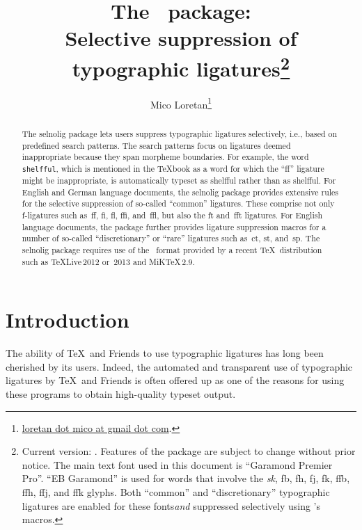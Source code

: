 \documentclass[11pt]{article}
\title{The \selnoligpackagename\ package: \\
Selective suppression of typographic ligatures\thanks{
Current version: \selnoligpackageversion. Features of the \pkg{selnolig} package are subject to change without prior notice. 
\newline\hspace*{\parindent}
The main text font used in this document is \enquote{Garamond Premier Pro}. \enquote{\ebg EB Garamond} is used for words that involve the \emph{\mbox{\ebg sk}}, {\ebg \mbox{fb}, \mbox{fh}, \mbox{fj}, \mbox{fk}, \mbox{ffb}, \mbox{ffh}, \mbox{ffj}, and \mbox{ffk}} glyphs. Both \enquote{common} and \enquote{discretionary} typographic ligatures are enabled for these fonts\textemdash \emph{and} suppressed selectively using \pkg{selnolig}'s macros.}}
\author{Mico Loretan\thanks{
\href{mailto:loretan.mico@gmail.com}{loretan dot mico at gmail dot com}.}}
\date{\selnoligpackagedate}
\newcommand{\pkg}[1]{\textsf{#1}}
\newcommand{\opt}[1]{\texttt{#1}}
\begin{document}
\VerbatimFootnotes
{}
\maketitle


\begin{abstract}

The \pkg{selnolig} package lets users suppress typographic ligatures selectively, i.e., based on predefined search patterns. The search patterns focus on ligatures deemed inappropriate because they span morpheme boundaries. For example, the word \opt{shelfful}, which is mentioned in the \TeX book as a word for which the \enquote{ff} ligature might be inappropriate, is automatically typeset as shelfful rather than as shel\mbox{ff}ul.
\newline\hspace*{\parindent}
For English and German language documents, the \pkg{selnolig} package provides extensive rules for the selective suppression of so-called \enquote{common} ligatures. These comprise not only f-ligatures such as~ff, fi, fl, ffi, and~ffl, but also the ft and~fft ligatures.
\newline\hspace*{\parindent}
For English language documents, the package further provides ligature suppression macros for a number of so-called \enquote{discretionary} or \enquote{rare} ligatures such as~ct, st, and~sp.
\newline\hspace*{\parindent}
The \pkg{selnolig} package requires use of the \LuaLaTeX\ format provided by a recent \TeX\ distribution such as \TeX Live\,2012 or~2013 and MiK\TeX\,2.9.
\end{abstract}

\tableofcontents

\clearpage
{}

\section{Introduction}

The ability of \TeX\ and Friends to use typographic ligatures has long been cherished by its users. Indeed, the automated and transparent use of typographic ligatures by \TeX\ and Friends is often offered up as one of the reasons for using these programs to obtain high-quality typeset output.
\end{document}
